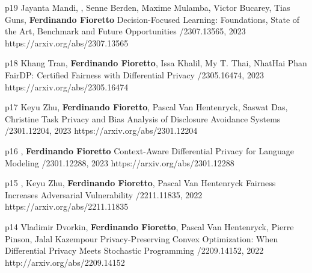 \begin{pubs}

\wsentry
	{p19}
	{Jayanta Mandi, , Senne Berden, Maxime Mulamba, Victor Bucarey, Tias Guns, {\bf Ferdinando Fioretto}} 
	{Decision-Focused Learning: Foundations, State of the Art, Benchmark and Future Opportunities}
	{/2307.13565, 2023}
	{https://arxiv.org/abs/2307.13565}

\wsentry
	{p18}
	{Khang Tran, {\bf Ferdinando Fioretto}, Issa Khalil, My T. Thai, NhatHai Phan} 
	{FairDP: Certified Fairness with Differential Privacy}
	{/2305.16474, 2023}
	{https://arxiv.org/abs/2305.16474}



\wsentry 
	{p17}%
	{Keyu Zhu, {\bf Ferdinando Fioretto}, Pascal Van Hentenryck, Saswat Das, Christine Task}
	{Privacy and Bias Analysis of Disclosure Avoidance Systems}
	{/2301.12204, 2023}
	{https://arxiv.org/abs/2301.12204}

\wsentry 
	{p16}%
	{, {\bf Ferdinando Fioretto}}
	{Context-Aware Differential Privacy for Language Modeling}
	{/2301.12288, 2023}
	{https://arxiv.org/abs/2301.12288}

\wsentry 
	{p15}%
	{, Keyu Zhu, {\bf Ferdinando Fioretto}, Pascal Van Hentenryck}
	{Fairness Increases Adversarial Vulnerability}
	{/2211.11835, 2022}
	{https://arxiv.org/abs/2211.11835}




\wsentry 
	{p14}%
	{Vladimir Dvorkin, {\bf Ferdinando Fioretto}, Pascal Van Hentenryck, Pierre Pinson, Jalal Kazempour}
	{Privacy-Preserving Convex Optimization: When Differential Privacy Meets Stochastic Programming}
	{/2209.14152, 2022}
	{http://arxiv.org/abs/2209.14152}


\end{pubs}
